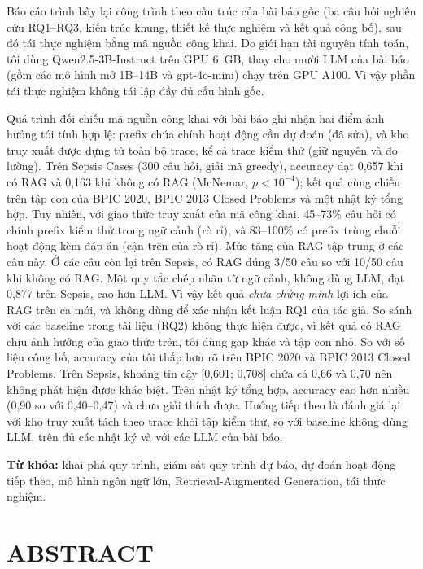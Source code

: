 \documentclass[a4paper,12pt,oneside]{report}
\begin{document}
Báo cáo trình bày lại công trình theo cấu trúc của bài báo gốc (ba câu hỏi nghiên cứu RQ1--RQ3, kiến trúc khung, thiết kế thực nghiệm và kết quả công bố), sau đó tái thực nghiệm bằng mã nguồn công khai. Do giới hạn tài nguyên tính toán, tôi dùng Qwen2.5-3B-Instruct trên GPU 6~GB, thay cho mười LLM của bài báo (gồm các mô hình mở 1B--14B và gpt-4o-mini) chạy trên GPU A100. Vì vậy phần tái thực nghiệm không tái lập đầy đủ cấu hình gốc.

Quá trình đối chiếu mã nguồn công khai với bài báo ghi nhận hai điểm ảnh hưởng tới tính hợp lệ: prefix chứa chính hoạt động cần dự đoán (đã sửa), và kho truy xuất được dựng từ toàn bộ trace, kể cả trace kiểm thử (giữ nguyên và đo lường). Trên Sepsis Cases (300 câu hỏi, giải mã greedy), accuracy đạt 0,657 khi có RAG và 0,163 khi không có RAG (McNemar, $p < 10^{-4}$); kết quả cùng chiều trên tập con của BPIC 2020, BPIC 2013 Closed Problems và một nhật ký tổng hợp. Tuy nhiên, với giao thức truy xuất của mã công khai, 45--73\% câu hỏi có chính prefix kiểm thử trong ngữ cảnh (rò rỉ), và 83--100\% có prefix trùng chuỗi hoạt động kèm đáp án (cận trên của rò rỉ). Mức tăng của RAG tập trung ở các câu này. Ở các câu còn lại trên Sepsis, có RAG đúng 3/50 câu so với 10/50 câu khi không có RAG. Một quy tắc chép nhãn từ ngữ cảnh, không dùng LLM, đạt 0,877 trên Sepsis, cao hơn LLM. Vì vậy kết quả \textit{chưa chứng minh} lợi ích của RAG trên ca mới, và không dùng để xác nhận kết luận RQ1 của tác giả. So sánh với các baseline trong tài liệu (RQ2) không thực hiện được, vì kết quả có RAG chịu ảnh hưởng của giao thức trên, tôi dùng gap khác và tập con nhỏ. So với số liệu công bố, accuracy của tôi thấp hơn rõ trên BPIC 2020 và BPIC 2013 Closed Problems. Trên Sepsis, khoảng tin cậy [0,601; 0,708] chứa cả 0,66 và 0,70 nên không phát hiện được khác biệt. Trên nhật ký tổng hợp, accuracy cao hơn nhiều (0,90 so với 0,40--0,47) và chưa giải thích được. Hướng tiếp theo là đánh giá lại với kho truy xuất tách theo trace khỏi tập kiểm thử, so với baseline không dùng LLM, trên đủ các nhật ký và với các LLM của bài báo.

\vspace{0.5cm}
\noindent\textbf{Từ khóa:} khai phá quy trình, giám sát quy trình dự báo, dự đoán hoạt động tiếp theo, mô hình ngôn ngữ lớn, Retrieval-Augmented Generation, tái thực nghiệm.

\clearpage
\chapter*{ABSTRACT}
\end{document}
